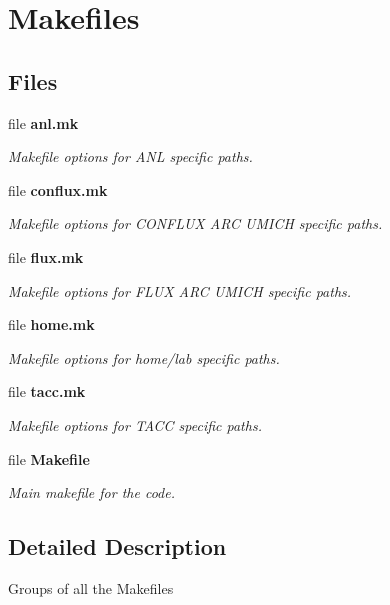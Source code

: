 \section{Makefiles}
\label{group__makefiles}
\subsection*{Files}
\begin{DoxyCompactItemize}
\item 
file {\bf anl.\-mk}
\begin{DoxyCompactList}\small\item\em Makefile options for A\-N\-L specific paths. \end{DoxyCompactList}\item 
file {\bf conflux.\-mk}
\begin{DoxyCompactList}\small\item\em Makefile options for C\-O\-N\-F\-L\-U\-X A\-R\-C U\-M\-I\-C\-H specific paths. \end{DoxyCompactList}\item 
file {\bf flux.\-mk}
\begin{DoxyCompactList}\small\item\em Makefile options for F\-L\-U\-X A\-R\-C U\-M\-I\-C\-H specific paths. \end{DoxyCompactList}\item 
file {\bf home.\-mk}
\begin{DoxyCompactList}\small\item\em Makefile options for home/lab specific paths. \end{DoxyCompactList}\item 
file {\bf tacc.\-mk}
\begin{DoxyCompactList}\small\item\em Makefile options for T\-A\-C\-C specific paths. \end{DoxyCompactList}\item 
file {\bf Makefile}
\begin{DoxyCompactList}\small\item\em Main makefile for the code. \end{DoxyCompactList}\end{DoxyCompactItemize}


\subsection{Detailed Description}
Groups of all the Makefiles 